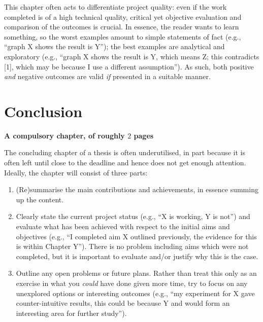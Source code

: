 \documentclass[ %
                    author={Sam Phippen},
                supervisor={Dr. Rafal Bogacz},
                     title={Real time voice activity detectors in noisy personal computing environments},
                  subtitle={},
                    degree={MEng},
                      year={2012} ]{thesis}
\begin{document}
\noindent
This chapter often acts to differentiate project quality: even if the work
completed is of a high technical quality, critical yet objective evaluation 
and comparison of the outcomes is crucial.  In essence, the reader wants to
learn something, so the worst examples amount to simple statements of fact 
(e.g., ``graph X shows the result is Y''); the best examples are analytical 
and exploratory (e.g., ``graph X shows the result is Y, which means Z; this 
contradicts [1], which may be because I use a different assumption'').  As 
such, both positive {\em and} negative outcomes are valid {\em if} presented 
in a suitable manner.


\chapter{Conclusion}
\label{chap:conclusion}

{\bf A compulsory chapter, of roughly $2$ pages} 
\vspace{1cm} 

\noindent
The concluding chapter of a thesis is often underutilised, in part because
it is often left until close to the deadline and hence does not get enough 
attention.  Ideally, the chapter will consist of three parts:

\begin{enumerate}
\item (Re)summarise the main contributions and achievements, in essence
      summing up the content.
\item Clearly state the current project status (e.g., ``X is working, Y 
      is not'') and evaluate what has been achieved with respect to the 
      initial aims and objectives (e.g., ``I completed aim X outlined 
      previously, the evidence for this is within Chapter Y'').  There 
      is no problem including aims which were not completed, but it is 
      important to evaluate and/or justify why this is the case.
\item Outline any open problems or future plans.  Rather than treat this
      only as an exercise in what you {\em could} have done given more 
      time, try to focus on any unexplored options or interesting outcomes
      (e.g., ``my experiment for X gave counter-intuitive results, this 
      could be because Y and would form an interesting area for further 
      study'').
\end{enumerate}
\end{document}
